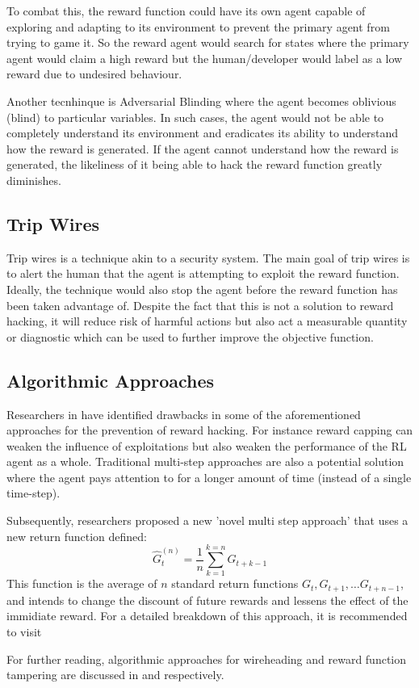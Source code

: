 To combat this, the reward function could have its own agent capable of exploring and adapting to its environment to prevent the primary agent from trying to game it.
So the reward agent would search for states where the primary agent would claim a high reward but the human/developer would label as a low reward due to undesired behaviour.

Another tecnhinque is Adversarial Blinding where the agent becomes oblivious (blind) to particular variables.
In such cases, the agent would not be able to completely understand its environment and eradicates its ability to understand how the reward is generated.
If the agent cannot understand how the reward is generated, the likeliness of it being able to hack the reward function greatly diminishes.

\subsection{Trip Wires}
Trip wires is a technique akin to a security system. The main goal of trip wires is to alert the human that the agent is attempting to exploit the reward function.
Ideally, the technique would also stop the agent before the reward function has been taken advantage of.
Despite the fact that this is not a solution to reward hacking, it will reduce risk of harmful actions but also act a measurable quantity or diagnostic which can be used to further improve the objective function.

\subsection{Algorithmic Approaches}
Researchers in \cite{multi-step} have identified drawbacks in some of the aforementioned approaches for the prevention of reward hacking.
For instance reward capping can weaken the influence of exploitations but also weaken the performance of the RL agent as a whole.
Traditional multi-step approaches are also a potential solution where the agent pays attention to for a longer amount of time (instead of a single time-step).

Subsequently, researchers proposed a new 'novel multi step approach' that uses a new return function defined:
\begin{equation}
    \hat{G}_t^{(n)} = \frac{1}{n} \sum^{k=n}_{k=1} G_{t+k-1}
\end{equation}
This function is the average of $n$ standard return functions $G_t, G_{t+1},\dots G_{t+n-1}$, and 
intends to change the discount of future rewards and lessens the effect of the immidiate reward.
For a detailed breakdown of this approach, it is recommended to visit \cite{multi-step}

For further reading, algorithmic approaches for wireheading and reward function tampering are discussed in \cite{Wireheading} and \cite{DBLP:journals/corr/abs-1908-04734} respectively.
